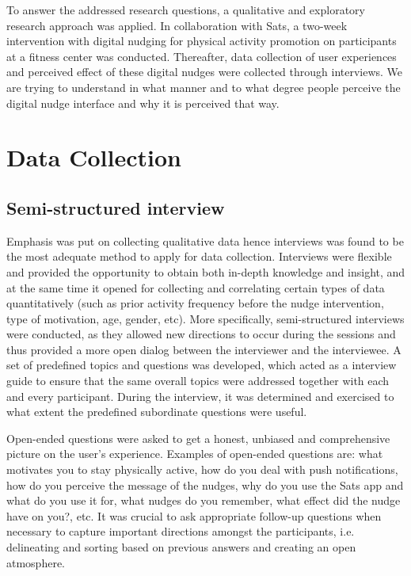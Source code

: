 To answer the addressed research questions, a qualitative and exploratory research approach was applied. In collaboration with Sats, a two-week intervention with digital nudging for physical activity promotion on participants at a fitness center was conducted. Thereafter, data collection of user experiences and perceived effect of these digital nudges were collected through interviews. We are trying to understand in what manner and to what degree people perceive the digital nudge interface and why it is perceived that way.



\section{Data Collection}
    \subsection{Semi-structured interview}
    Emphasis was put on collecting qualitative data hence interviews was found to be the most adequate method to apply for data collection. Interviews were flexible and provided the opportunity to obtain both in-depth knowledge and insight, and at the same time it opened for collecting and correlating certain types of data quantitatively (such as prior activity frequency before the nudge intervention,  type of motivation, age, gender, etc). More specifically, semi-structured interviews were conducted, as they allowed new directions to occur during the sessions and thus provided a more open dialog between the interviewer and the interviewee. A set of predefined topics and questions was developed, which acted as a interview guide to ensure that the same overall topics were addressed together with each and every participant. During the interview, it was determined and exercised to what extent the predefined subordinate questions were useful. 

    Open-ended questions were asked to get a honest, unbiased and comprehensive picture on the user’s experience. Examples of open-ended questions are: what motivates you to stay physically active, how do you deal with push notifications, how do you perceive the message of the nudges, why do you use the Sats app and what do you use it for, what nudges do you remember, what effect did the nudge have on you?, etc. It was crucial to ask appropriate follow-up questions when necessary to capture important directions amongst the participants, i.e. delineating and sorting based on previous answers and creating an open atmosphere.
  
